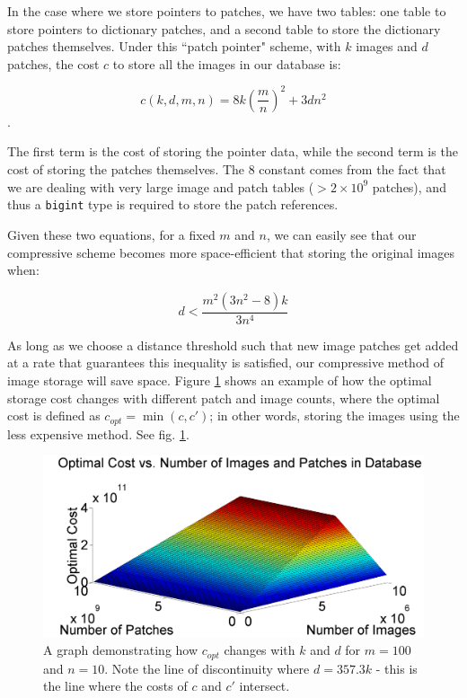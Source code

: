 \noindent In the case where we store pointers to patches, we have two tables: one table to store pointers to dictionary patches, and a second table to store the dictionary patches themselves.  Under this ``patch pointer" scheme, with $k$ images and $d$ patches, the cost $c$ to store all the images in our database is:

\begin{equation}
	c(k, d, m, n) = 8 k \left(\frac{m}{n}\right)^2 + 3  d  n^2
\end{equation}.

The first term is the cost of storing the pointer data, while the second term is the cost of storing the patches themselves.  The $8$ constant comes from the fact that we are dealing with very large image and patch tables ($ > 2 \times 10^9$ patches), and thus a \texttt{bigint} type is required to store the patch references.

Given these two equations, for a fixed $m$ and $n$, we can easily see that our compressive scheme becomes more space-efficient that storing the original images when:

\begin{equation}
	d < \frac{m^2 (3n^2 - 8) k}{3n^4}
\end{equation}

As long as we choose a distance threshold such that new image patches get added at a rate that guarantees this inequality is satisfied, our compressive method of image storage will save space.  Figure \ref{fig:optcost} shows an example of how the optimal storage cost changes with different patch and image counts, where the optimal cost is defined as $c_{opt} = \min{(c, c')}$; in other words, storing the images using the less expensive method. See fig. \ref{fig:optcost}.

 \begin{figure}
\includegraphics[width=1\linewidth]{Figures/PatchCosts.png}
\caption{A graph demonstrating how $c_{opt}$ changes with $k$ and $d$ for $m=100$ and $n=10$.  Note the line of discontinuity where $d = 357.3 k$ - this is the line where the costs of $c$ and $c'$ intersect.}
\label{fig:optcost}
\end{figure}


